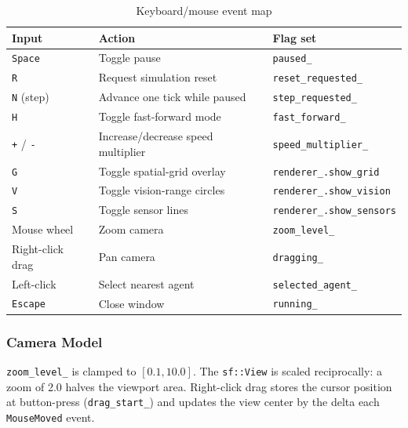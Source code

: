\begin{table}[H]
\centering\small
\caption{Keyboard/mouse event map}
\begin{tabular}{@{}lll@{}}
\toprule
\textbf{Input} & \textbf{Action} & \textbf{Flag set} \\
\midrule
\texttt{Space}        & Toggle pause                        & \texttt{paused\_} \\
\texttt{R}            & Request simulation reset            & \texttt{reset\_requested\_} \\
\texttt{N} (step)     & Advance one tick while paused       & \texttt{step\_requested\_} \\
\texttt{H}            & Toggle fast-forward mode            & \texttt{fast\_forward\_} \\
\texttt{+} / \texttt{-}& Increase/decrease speed multiplier & \texttt{speed\_multiplier\_} \\
\texttt{G}            & Toggle spatial-grid overlay         & \texttt{renderer\_.show\_grid} \\
\texttt{V}            & Toggle vision-range circles         & \texttt{renderer\_.show\_vision} \\
\texttt{S}            & Toggle sensor lines                 & \texttt{renderer\_.show\_sensors} \\
Mouse wheel           & Zoom camera                         & \texttt{zoom\_level\_} \\
Right-click drag      & Pan camera                          & \texttt{dragging\_} \\
Left-click            & Select nearest agent                & \texttt{selected\_agent\_} \\
\texttt{Escape}       & Close window                        & \texttt{running\_} \\
\bottomrule
\end{tabular}
\end{table}

\subsubsection{Camera Model}

\texttt{zoom\_level\_} is clamped to $[0.1, 10.0]$.  The \texttt{sf::View} is scaled
reciprocally: a zoom of 2.0 halves the viewport area.  Right-click drag stores the
cursor position at button-press (\texttt{drag\_start\_}) and updates the view center by
the delta each \texttt{MouseMoved} event.
